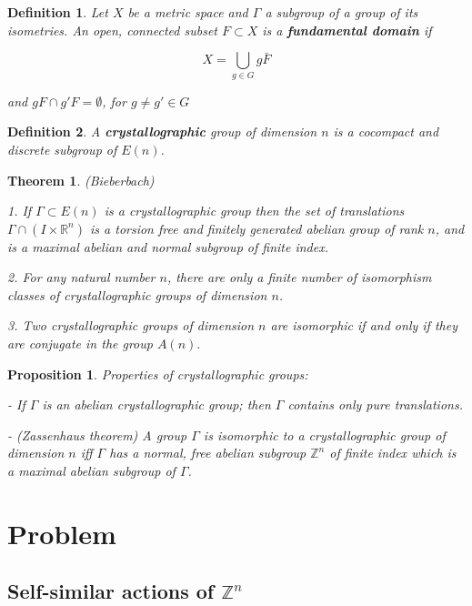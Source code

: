 \documentclass[a4paper,12pt]{amsart}
\newtheorem{definition}{Definition}
\newtheorem{proposition}{Proposition}
\newtheorem{theorem}{Theorem}
\begin{document}
	\begin{definition}
		Let $X$ be a metric space and $\Gamma$ a subgroup of a group of its isometries. An open, connected subset $F \subset X$ is a \textbf{fundamental domain} if 
		
		$$X = \bigcup_{g \in G} g \bar{F}$$
		
		and $gF \cap g'F = \emptyset$, for $g \ne g' \in G$
	\end{definition}

	
	\begin{definition}
		A \textbf{crystallographic} group of dimension $n$ is a cocompact and discrete subgroup of $E(n)$.
	\end{definition}

	\begin{theorem}
		(Bieberbach) 
		
		1. If $\Gamma \subset E(n)$ is a crystallographic group then the set of translations $\Gamma \cap (I \times \mathbb{R}^n)$ is a torsion free and finitely generated abelian group of rank $n$, and is a maximal abelian and normal subgroup of finite index. 
		
		2. For any natural number $n$, there are only a finite number of isomorphism classes of crystallographic groups of dimension $n$.
		
		3. Two crystallographic groups of dimension $n$ are isomorphic if and only if they are conjugate in the group $A(n).$
	\end{theorem}

	
	\begin{proposition}
		Properties of crystallographic groups: 
		
		- If $\Gamma$ is an abelian crystallographic group; then $\Gamma$ contains only pure translations. 
		
		- (Zassenhaus theorem) A group $\Gamma$ is isomorphic to a crystallographic group of dimension $n$ iff $\Gamma$ has a normal, free abelian subgroup $\mathbb{Z}^n$ of finite index which is a maximal abelian subgroup of $\Gamma$.	
	
        
	\end{proposition}

	\newpage
	\section{Problem}
	
	\subsection{Self-similar actions of $\mathbb{Z}^n$}
	
\end{document}

